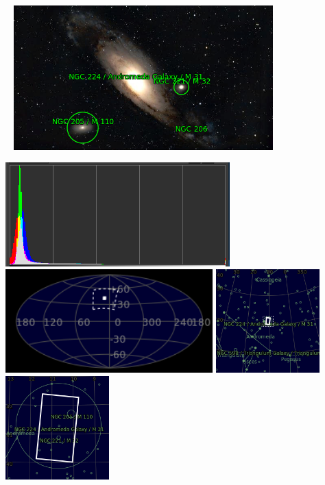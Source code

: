 \begin{center}
 \ \newpage
\includegraphics[width=0.75\textwidth]{../Imaging//Annotated/Andromeda_Galaxy_Annotated.jpg}

\includegraphics[height=4cm]{../Imaging//Annotated/Andromeda_Galaxy_Hist}
\includegraphics[height=4cm]{../Imaging//Annotated/Andromeda_Galaxy_Globe.jpg}
\includegraphics[height=4cm]{../Imaging//Annotated/Andromeda_Galaxy_Close.jpg}
\includegraphics[height=4cm]{../Imaging//Annotated/Andromeda_Galaxy_Closer.jpg}
\end{center}
